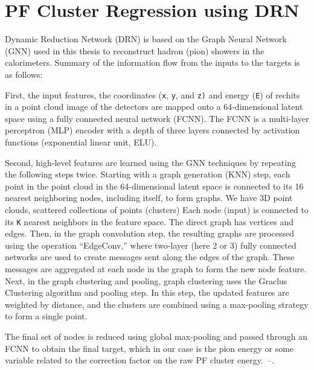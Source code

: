 \section{PF Cluster Regression using DRN}
Dynamic Reduction Network (DRN)%
is based on the Graph Neural Network (GNN) used in this thesis to reconstruct hadron (pion) showers in the calorimeters.
 Summary of the information flow from the inputs to the targets is as follows:

First, the input features, the coordinates ({\tt x}, {\tt y}, and {\tt z)} and energy ({\tt E}) of rechits in a point cloud image of the detectors are mapped onto a 64-dimensional latent space using a fully connected neural network (FCNN).
The FCNN is a multi-layer perceptron (MLP) encoder with a depth of three layers connected by activation functions (exponential linear unit, ELU).

Second, high-level features are learned using the GNN techniques by repeating the following steps twice.
Starting with a graph generation (KNN) step, each point in the point cloud in the 64-dimensional latent space is connected to its 16 nearest neighboring nodes, including itself, to form graphs.
We have 3D point clouds, scattered collections of points (clusters)%
 Each node (input) is connected to its {\tt K} nearest neighbors in the feature space. The direct graph has vertices and edges. %
Then, in the graph convolution step, the resulting graphs are processed using the operation “EdgeConv,” where two-layer (here 2 or 3) fully connected networks are used to create messages sent along the edges of the graph.
These messages are aggregated at each node in the graph to form the new node feature. %
Next, in the graph clustering and pooling, graph clustering uses the Graclus Clustering algorithm and pooling step.
In this step, the updated features are weighted by distance, and the clusters are combined using a max-pooling strategy to form a single point.

The final set of nodes is reduced using global max-pooling and passed through an FCNN to obtain the final target, which in our case is the pion energy or some variable related to the correction factor on the raw PF cluster energy.~\cite{GNN_DRN}--\cite{DGCNN}.

